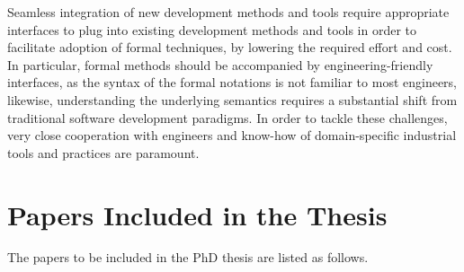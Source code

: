 Seamless integration of new development methods and tools require appropriate interfaces to plug into existing development methods and tools in order to facilitate adoption of formal techniques, by lowering the required effort and cost. In particular, formal methods should be accompanied by engineering-friendly interfaces, as the syntax of the formal notations is not familiar to most engineers, likewise, understanding the underlying semantics requires a substantial shift from traditional software development paradigms. In order to tackle these challenges, very close cooperation with engineers and know-how of domain-specific industrial tools and practices are paramount.

\section{Papers Included in the Thesis}\label{papersincl}
The papers to be included in the PhD thesis are listed as follows.

